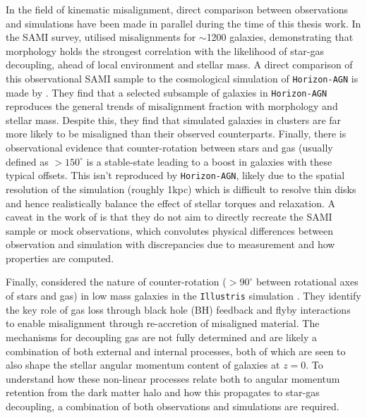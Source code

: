 In the field of kinematic misalignment, direct comparison between observations and simulations have been made in parallel during the time of this thesis work. In the SAMI survey, \citet{bryant2019} utilised misalignments for $\sim$1200 galaxies, demonstrating that morphology holds the strongest correlation with the likelihood of star-gas decoupling, ahead of local environment and stellar mass. A direct comparison of this observational SAMI sample to the cosmological simulation of \texttt{Horizon-AGN} is made by \citet{khim2019}. They find that a selected subsample of galaxies in \texttt{Horizon-AGN} reproduces the general trends of misalignment fraction with morphology and stellar mass. Despite this, they find that simulated galaxies in clusters are far more likely to be misaligned than their observed counterparts. Finally, there is observational evidence \citep[e.g.][]{davis2016, chen2016} that counter-rotation between stars and gas (usually defined as $> 150^{\circ}$ is a stable-state leading to a boost in galaxies with these typical offsets. This isn't reproduced by \texttt{Horizon-AGN}, likely due to the spatial resolution of the simulation (roughly 1kpc) which is difficult to resolve thin disks and hence realistically balance the effect of stellar torques and relaxation. A caveat in the work of \citet{khim2019} is that they do not aim to directly recreate the SAMI sample or mock observations, which convolutes physical differences between observation and simulation with discrepancies due to measurement and how properties are computed. 

Finally, \citet{starkenburg+19} considered the nature of counter-rotation ($\mathrm{> 90^{\circ}}$ between rotational axes of stars and gas) in low mass galaxies in the \texttt{Illustris} simulation \citep{illustris_a, illustris_b, illustris_c, illustris_d}. They identify the key role of gas loss through black hole (BH) feedback and flyby interactions to enable misalignment through re-accretion of misaligned material. The mechanisms for decoupling gas are not fully determined and are likely a combination of both external and internal processes, both of which are seen to also shape the stellar angular momentum content of galaxies at $z=0$. To understand how these non-linear processes relate both to angular momentum retention from the dark matter halo and how this propagates to star-gas decoupling, a combination of both observations and simulations are required. 

